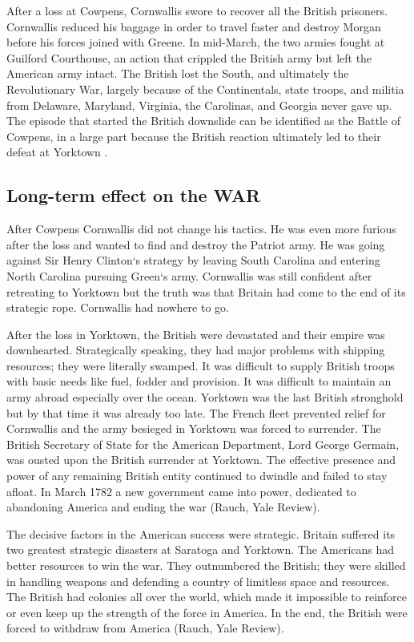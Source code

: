 After a loss at Cowpens, Cornwallis swore to recover all the British prisoners.
Cornwallis reduced his baggage in order to travel faster and destroy Morgan
before his forces joined with Greene. In mid-March, the two armies fought at
Guilford Courthouse, an action that crippled the British army but left the
American army intact. The British lost the South, and ultimately the
Revolutionary War, largely because of the Continentals, state troops, and
militia from Delaware, Maryland, Virginia, the Carolinas, and Georgia never gave
up. The episode that started the British downslide can be identified as the
Battle of Cowpens, in a large part because the British reaction ultimately led
to their defeat at Yorktown \cite[147-148]{babits_devil_2001}.

\subsection{Long-term effect on the WAR}

After Cowpens Cornwallis did not change his tactics. He was even more furious
after the loss and wanted to find and destroy the Patriot army. He was going
against Sir Henry Clinton`s strategy by leaving South Carolina and entering
North Carolina pursuing Green`s army. Cornwallis was still confident after
retreating to Yorktown but the truth was that Britain had come to the end of its
strategic rope. Cornwallis had nowhere to go.

After the loss in Yorktown, the British were devastated and their empire was
downhearted. Strategically speaking, they had major problems with shipping
resources; they were literally swamped. It was difficult to supply British
troops with basic needs like fuel, fodder and provision. It was difficult to
maintain an army abroad especially over the ocean. Yorktown was the last British
stronghold but by that time it was already too late. The French fleet prevented
relief for Cornwallis and the army besieged in Yorktown was forced to surrender.
The British Secretary of State for the American Department, Lord George Germain,
was ousted  upon the British surrender at Yorktown.  The effective presence and
power of any remaining British entity continued to dwindle and failed to stay
afloat. In March 1782 a new government came into power, dedicated to abandoning
America and ending the war (Rauch, Yale Review).

The decisive factors in the American success were strategic. Britain suffered
its two greatest strategic disasters at Saratoga and Yorktown. The Americans had
better resources to win the war.  They outnumbered the British; they were
skilled in handling weapons and defending a country of limitless space and
resources. The British had colonies all over the world, which made it impossible
to reinforce or even keep up the strength of the force in America. In the end,
the British were forced to withdraw from America (Rauch, Yale Review).

